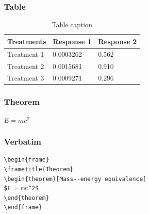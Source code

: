 































\begin{frame}
\frametitle{Table}
\begin{table}
\begin{tabular}{l l l}
\toprule
\textbf{Treatments} & \textbf{Response 1} & \textbf{Response 2}\\
\midrule
Treatment 1 & 0.0003262 & 0.562 \\
Treatment 2 & 0.0015681 & 0.910 \\
Treatment 3 & 0.0009271 & 0.296 \\
\bottomrule
\end{tabular}
\caption{Table caption}
\end{table}
\end{frame}


\begin{frame}
\frametitle{Theorem}
\begin{theorem}
$E = mc^2$
\end{theorem}
\end{frame}


\begin{frame}[fragile] %
\frametitle{Verbatim}
\begin{example}
\begin{verbatim}
\begin{frame}
\frametitle{Theorem}
\begin{theorem}[Mass--energy equivalence]
$E = mc^2$
\end{theorem}
\end{frame}\end{verbatim}
\end{example}
\end{frame}

